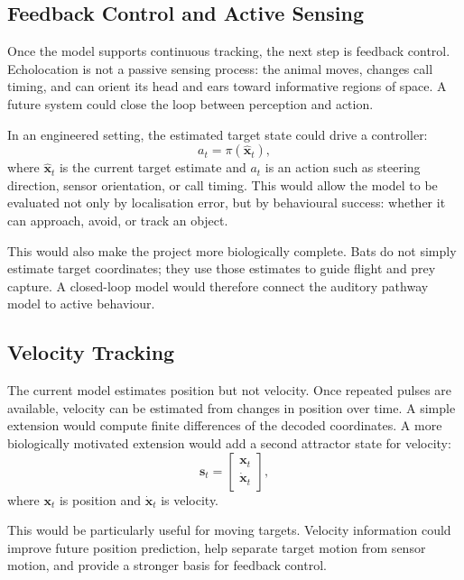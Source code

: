 \subsection{Feedback Control and Active Sensing}

Once the model supports continuous tracking, the next step is feedback control. Echolocation is not a passive sensing process: the animal moves, changes call timing, and can orient its head and ears toward informative regions of space. A future system could close the loop between perception and action.

In an engineered setting, the estimated target state could drive a controller:
\begin{equation}
    a_t = \pi(\hat{\mathbf{x}}_t),
\end{equation}
where $\hat{\mathbf{x}}_t$ is the current target estimate and $a_t$ is an action such as steering direction, sensor orientation, or call timing. This would allow the model to be evaluated not only by localisation error, but by behavioural success: whether it can approach, avoid, or track an object.

This would also make the project more biologically complete. Bats do not simply estimate target coordinates; they use those estimates to guide flight and prey capture. A closed-loop model would therefore connect the auditory pathway model to active behaviour.

\subsection{Velocity Tracking}

The current model estimates position but not velocity. Once repeated pulses are available, velocity can be estimated from changes in position over time. A simple extension would compute finite differences of the decoded coordinates. A more biologically motivated extension would add a second attractor state for velocity:
\begin{equation}
    \mathbf{s}_t =
    \begin{bmatrix}
        \mathbf{x}_t \\
        \dot{\mathbf{x}}_t
    \end{bmatrix},
\end{equation}
where $\mathbf{x}_t$ is position and $\dot{\mathbf{x}}_t$ is velocity.

This would be particularly useful for moving targets. Velocity information could improve future position prediction, help separate target motion from sensor motion, and provide a stronger basis for feedback control.


